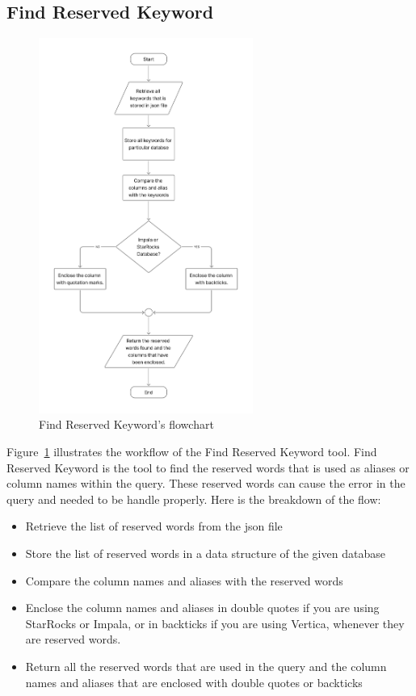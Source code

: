     \subsection{Find Reserved Keyword}
    \begin{figure}[H]
        \centering
        \includegraphics[width=7cm]{chapters/3/figures/reserved_words.jpg}
        \caption[Find Reserved Keyword’s flowchart]{Find Reserved Keyword’s flowchart}
        \label{fig:reserved_words}
    \end{figure}
    Figure~\ref{fig:reserved_words} illustrates the workflow of the Find Reserved Keyword tool. Find Reserved Keyword is the tool to find the reserved words that is used as aliases or column names within the query. These reserved words can cause the error in the query and needed to be handle properly.
    Here is the breakdown of the flow:
    \begin{itemize}
        \item  Retrieve the list of reserved words from the json file
        \item  Store the list of reserved words in a data structure of the given database
        \item  Compare the column names and aliases with the reserved words
        \item  Enclose the column names and aliases in double quotes if you are using StarRocks or Impala, or in backticks if you are using Vertica, whenever they are reserved words.
        \item  Return all the reserved words that are used in the query and the column names and aliases that are enclosed with double quotes or backticks
    \end{itemize}

